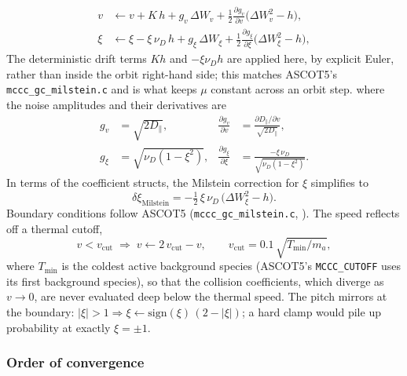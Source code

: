 \documentclass[11pt]{article}
\newcommand{\half}{\tfrac{1}{2}}
\begin{document}
\begin{align}
  v  &\leftarrow v
     + K\,h
     + g_v\,\Delta W_v
     + \half\frac{\partial g_v}{\partial v}\bigl(\Delta W_v^2 - h\bigr),
  \\[4pt]
  \xi &\leftarrow \xi
     - \xi\,\nu_D\,h
     + g_\xi\,\Delta W_\xi
     + \half\frac{\partial g_\xi}{\partial \xi}\bigl(\Delta W_\xi^2 - h\bigr),
\end{align}
The deterministic drift terms $K h$ and $-\xi\nu_D h$ are applied here, by
explicit Euler, rather than inside the orbit right-hand side; this matches
ASCOT5's \texttt{mccc\_gc\_milstein.c} and is what keeps $\mu$ constant across
an orbit step.
where the noise amplitudes and their derivatives are
\begin{align}
  g_v  &= \sqrt{2D_{\parallel}},
  &\frac{\partial g_v}{\partial v} &= \frac{\partial D_{\parallel}/\partial v}{\sqrt{2D_{\parallel}}},
  \\[4pt]
  g_\xi &= \sqrt{\nu_D(1-\xi^2)},
  &\frac{\partial g_\xi}{\partial \xi} &= \frac{-\xi\,\nu_D}{\sqrt{\nu_D(1-\xi^2)}}.
\end{align}
In terms of the coefficient structs, the Milstein correction for $\xi$ simplifies to
\begin{equation}
  \delta\xi_{\mathrm{Milstein}}
  = -\half\,\xi\,\nu_D\,\bigl(\Delta W_\xi^2 - h\bigr).
\end{equation}
Boundary conditions follow ASCOT5 (\texttt{mccc\_gc\_milstein.c},
\cite{ascot5code}).  The speed reflects off a thermal cutoff,
\begin{equation}
  v < v_{\mathrm{cut}} \;\Rightarrow\; v \leftarrow 2\,v_{\mathrm{cut}} - v,
  \qquad
  v_{\mathrm{cut}} = 0.1\,\sqrt{T_{\min}/m_a},
\end{equation}
where $T_{\min}$ is the coldest active background species (ASCOT5's
\texttt{MCCC\_CUTOFF} uses its first background species), so that the
collision coefficients, which diverge as $v\to0$, are never evaluated deep
below the thermal speed.  The pitch mirrors at the boundary:
$|\xi| > 1 \Rightarrow \xi \leftarrow \mathrm{sign}(\xi)\,(2 - |\xi|)$;
a hard clamp would pile up probability at exactly $\xi = \pm 1$.

\subsubsection*{Order of convergence}
\label{sec:milstein-order}
\end{document}
